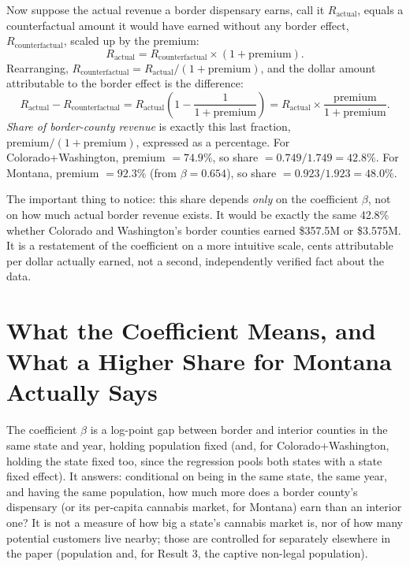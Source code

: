 \documentclass[11pt]{article}
\begin{document}
Now suppose the actual revenue a border dispensary earns, call it $R_{\text{actual}}$, equals a
counterfactual amount it would have earned without any border effect, $R_{\text{counterfactual}}$, scaled
up by the premium:
\[
R_{\text{actual}} = R_{\text{counterfactual}} \times (1 + \text{premium}).
\]
Rearranging, $R_{\text{counterfactual}} = R_{\text{actual}} / (1+\text{premium})$, and the dollar amount
attributable to the border effect is the difference:
\[
R_{\text{actual}} - R_{\text{counterfactual}} = R_{\text{actual}}\left(1 - \frac{1}{1+\text{premium}}\right)
= R_{\text{actual}} \times \frac{\text{premium}}{1+\text{premium}}.
\]
\emph{Share of border-county revenue} is exactly this last fraction, $\text{premium}/(1+\text{premium})$,
expressed as a percentage. For Colorado+Washington, premium $=74.9\%$, so share
$=0.749/1.749=42.8\%$. For Montana, premium $=92.3\%$ (from $\beta=0.654$), so share
$=0.923/1.923=48.0\%$.

The important thing to notice: this share depends \emph{only} on the coefficient $\beta$, not on how much
actual border revenue exists. It would be exactly the same 42.8\% whether Colorado and Washington's
border counties earned \$357.5M or \$3.575M. It is a restatement of the coefficient on a more intuitive
scale, cents attributable per dollar actually earned, not a second, independently verified fact about
the data.

\section{What the Coefficient Means, and What a Higher Share for Montana Actually Says}
\label{sec:coefficient-meaning}

The coefficient $\beta$ is a log-point gap between border and interior counties in the same state and
year, holding population fixed (and, for Colorado+Washington, holding the state fixed too, since the
regression pools both states with a state fixed effect). It answers: conditional on being in the same
state, the same year, and having the same population, how much more does a border county's dispensary (or
its per-capita cannabis market, for Montana) earn than an interior one? It is not a measure of how big a
state's cannabis market is, nor of how many potential customers live nearby; those are controlled for
separately elsewhere in the paper (population and, for Result 3, the captive non-legal population).
\end{document}
